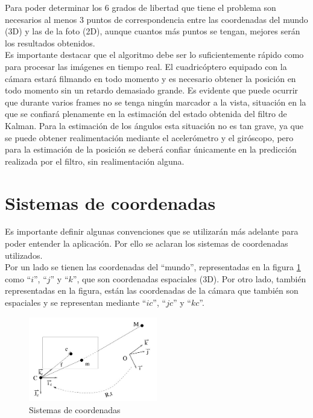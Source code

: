 Para poder determinar los 6 grados de libertad que tiene el problema son necesarios al menos 3 puntos de correspondencia entre las coordenadas del mundo (3D) y las de la foto (2D), aunque cuantos más puntos se tengan, mejores serán los resultados obtenidos.\\

Es importante destacar que el algoritmo debe ser lo suficientemente rápido como para procesar las imágenes en tiempo real. El cuadricóptero equipado con la cámara estará filmando en todo momento y es necesario obtener la posición en todo momento sin un retardo demasiado grande. Es evidente que puede ocurrir que durante varios frames no se tenga ningún marcador a la vista, situación en la que se confiará plenamente en la estimación del estado obtenida del filtro de Kalman. Para la estimación de los ángulos esta situación no es tan grave, ya que se puede obtener realimentación mediante el acelerómetro y el giróscopo, pero para la estimación de la posición se deberá confiar únicamente en la predicción realizada por el filtro, sin realimentación alguna.

\section{Sistemas de coordenadas}

Es importante definir algunas convenciones que se utilizarán más adelante para poder entender la aplicación. Por ello se aclaran los sistemas de coordenadas utilizados.\\

Por un lado se tienen las coordenadas del ``mundo'', representadas en la figura \ref{fig:coordenadas} como ``$i$'', ``$j$'' y ``$k$'', que son coordenadas espaciales (3D). Por otro lado, también representadas en la figura, están las coordenadas de la cámara que también son espaciales y se representan mediante ``$ic$'', ``$jc$'' y ``$kc$''.

\begin{figure}
	\begin{center}
		\includegraphics[width=0.5\textwidth]{./pics_camara/coordenadas.jpg}
	\end{center}
	\caption{Sistemas de coordenadas}
	\label{fig:coordenadas}
\end{figure}

